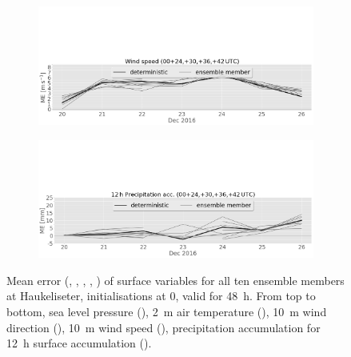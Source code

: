 \begin{figure}[H]
\begin{subfigure}[b]{0.8\textwidth}
			\caption{}\label{fig:bias:wd}
		\end{subfigure}
	\centering
		\begin{subfigure}[b]{0.8\textwidth}
			\includegraphics[trim={0cm 0cm 0cm 9.5cm},clip,width=\textwidth]{./fig_sfc_ws/ME_20161220_26_00}
			\caption{}\label{fig:bias:ws}
		\end{subfigure}
        \begin{subfigure}[b]{0.8\textwidth}
			\includegraphics[trim={0cm 0cm 0cm 9.5cm},clip,width=\textwidth]{./fig_sfc_precip/ME12_20161220_26_00}
			\caption{}\label{fig:bias:precip12}
		\end{subfigure}
	\caption{{Mean error (\protect{}, \protect{}, \protect{}, \protect{}, \protect{}) of surface variables for all ten ensemble members at Haukeliseter, initialisations at \SI{0}{\UTC}, valid for \SI{48}{\hour}. From top to bottom, sea level pressure (\protect{}), \SI{2}{\metre} air temperature (\protect{}), \SI{10}{\metre} wind direction (\protect{})},  \SI{10}{\metre} wind speed (\protect{}), precipitation accumulation for 
    \SI{12}{\hour} surface accumulation (\protect{}). } \label{fig:bias} 
\end{figure}
